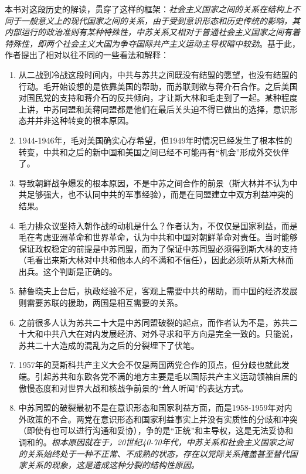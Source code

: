本书对这段历史的解读，贯穿了这样的框架：\emph{社会主义国家之间的关系在结构上不同于一般意义上的现代国家之间的关系，由于受到意识形态和历史传统的影响，其内部运行的政治准则有某种特殊性，中苏关系又相对于普通社会主义国家之间有着特殊性，即两个社会主义大国为争夺国际共产主义运动主导权暗中较劲}。基于此，作者提出了相对以往不同的一些看法和解释：
\begin{enumerate}
    \item 从二战到冷战这段时间内，中共与苏共之间既没有结盟的愿望，也没有结盟的行动。毛开始设想的是依靠美国的帮助，而苏联则欲与蒋介石合作。之后美国对国民党的支持和蒋介石的反共倾向，才让斯大林和毛走到了一起。某种程度上讲，中苏同盟和美蒋同盟都是他们在最后关头迫不得已做出的选择，意识形态并并非这种转变的根本原因。
    \item 1944-1946年，毛对美国确实心存希望，但1949年时情况已经发生了根本性的转变，中共和之后的新中国和美国之间已经不可能再有“机会”形成外交伙伴了。
    \item 导致朝鲜战争爆发的根本原因，不是中苏之间合作的前景（斯大林并不认为中共足够强大，也不认同中共的军事经验），而是在同盟建立中双方利益冲突的结果。
    \item 毛力排众议坚持入朝作战的动机是什么？作者认为，不仅仅是国家利益，而是毛在考虑亚洲革命和世界革命，认为中共和中国对朝鲜革命对责任。当时能够保证政权稳定的前提是中苏同盟，而为了保证中苏同盟必须得到斯大林的支持（毛看出来斯大林对中共和他本人的不满和不信任），因此必须听从斯大林而出兵。这个判断是正确的。
    \item 赫鲁晓夫上台后，执政经验不足，客观上需要中共的帮助，而中国的经济发展则需要苏联的援助，两国是相互需要的关系。
    \item 之前很多人认为苏共二十大是中苏同盟破裂的起点，而作者认为不是，苏共二十大和中共八大在对内发展经济、对外寻求和平方向是完全一致的。只能说，苏共二十大造成的混乱为之后的分裂埋下了伏笔。
    \item 1957年的莫斯科共产主义大会不仅是两国两党合作的顶点，但分歧也就此发端。引起苏共和东欧各党不满的地方主要是毛以国际共产主义运动领袖自居的傲慢态度和对世界大战和核战争前景的“耸人听闻”的表达方式。
    \item 中苏同盟的破裂最初不是在意识形态和国家利益方面，而是1958-1959年对内外政策的不合。两党在意识形态和国家利益事实上并没有实质性的分歧和冲突（即使有也可以进行沟通和妥协），争的是“正统”和主导权，这是无法妥协和调和的。\emph{根本原因就在于，20世纪40-70年代，中苏关系和社会主义国家之间的关系始终处于一种不正常、不成熟的状态，存在以党际关系掩盖甚至替代国家关系的现象，这是造成这种分裂的结构性原因。}
\end{enumerate}

